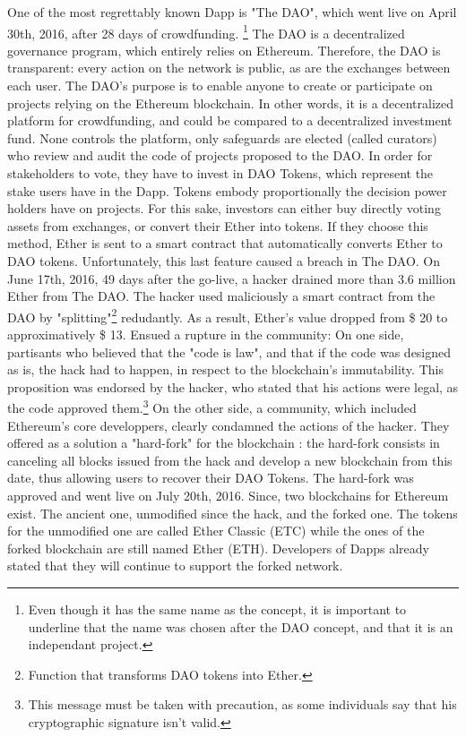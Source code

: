 \documentclass[11pt]{report}
\begin{document}
One of the most regrettably known Dapp is "The DAO", which went live on April 30th, 2016, after 28 days of crowdfunding. \cite{DAO}\footnote{Even though it has the same name as the concept, it is important to underline that the name was chosen after the DAO concept, and that it is an independant project.}\newline 
The DAO is a decentralized governance program, which entirely relies on Ethereum. Therefore, the DAO is transparent: every action on the network is public, as are the exchanges between each user. \newline
The DAO's purpose is to enable anyone to create or participate on projects relying on the Ethereum blockchain. In other words, it is a decentralized platform for crowdfunding, and could be compared to a decentralized investment fund. None controls the platform, only safeguards are elected (called curators) who review and audit the code of projects proposed to the DAO. \newline
In order for stakeholders to vote, they have to invest in DAO Tokens, which represent the stake users have in the Dapp. Tokens embody proportionally the decision power holders have on projects. For this sake, investors can either buy directly voting assets from exchanges, or convert their Ether into tokens. If they choose this method, Ether is sent to a smart contract that automatically converts Ether to DAO tokens. 
\newline
Unfortunately, this last feature caused a breach in The DAO. On June 17th, 2016, 49 days after the go-live, a hacker drained more than 3.6 million Ether from The DAO. The hacker used maliciously a smart contract from the DAO by "splitting"\footnote{Function that transforms DAO tokens into Ether.} redudantly. As a result, Ether's value dropped from \$ 20 to approximatively \$ 13. \clearpage
Ensued a rupture in the community: On one side, partisants who believed that the "code is law", and that if the code was designed as is, the hack had to happen, in respect to the blockchain's immutability. This proposition was endorsed by the hacker, who stated that his actions were legal, as the code approved them.\cite{HACKER}\footnote{This message must be taken with precaution, as some individuals say that his cryptographic signature isn't valid.} \newline
On the other side, a community, which included Ethereum's core developpers, clearly condamned the actions of the hacker. They offered as a solution a "hard-fork" for the blockchain : the hard-fork consists in canceling all blocks issued from the hack and develop a new blockchain from this date, thus allowing users to recover their DAO Tokens. The hard-fork was approved and went live on July 20th, 2016.\newline
Since, two blockchains for Ethereum exist. The ancient one, unmodified since the hack, and the forked one. The tokens for the unmodified one are called Ether Classic (ETC) while the ones of the forked blockchain are still named Ether (ETH). Developers of Dapps already stated that they will continue to support the forked network.
\newline
\end{document}
